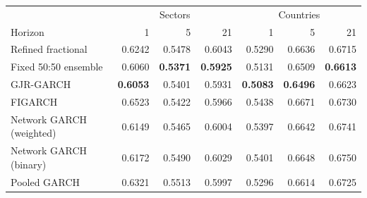 \begin{tabular}{lrrrrrr}
\toprule
 & \multicolumn{3}{c}{Sectors} & \multicolumn{3}{c}{Countries} \\
Horizon & 1 & 5 & 21 & 1 & 5 & 21 \\
\midrule
Refined fractional & 0.6242 & 0.5478 & 0.6043 & 0.5290 & 0.6636 & 0.6715 \\
Fixed 50:50 ensemble & 0.6060 & \textbf{0.5371} & \textbf{0.5925} & 0.5131 & 0.6509 & \textbf{0.6613} \\
GJR-GARCH & \textbf{0.6053} & 0.5401 & 0.5931 & \textbf{0.5083} & \textbf{0.6496} & 0.6623 \\
FIGARCH & 0.6523 & 0.5422 & 0.5966 & 0.5438 & 0.6671 & 0.6730 \\
Network GARCH (weighted) & 0.6149 & 0.5465 & 0.6004 & 0.5397 & 0.6642 & 0.6741 \\
Network GARCH (binary) & 0.6172 & 0.5490 & 0.6029 & 0.5401 & 0.6648 & 0.6750 \\
Pooled GARCH & 0.6321 & 0.5513 & 0.5997 & 0.5296 & 0.6614 & 0.6725 \\
\bottomrule
\end{tabular}
